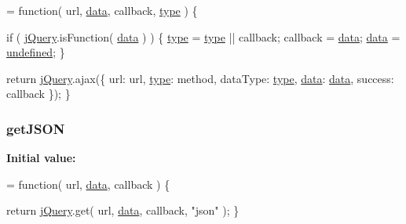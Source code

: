 \begin{DoxyCode}
= \textcolor{keyword}{function}( url, \hyperlink{jquery-1_810_82-vsdoc_8js_a609407b3456fdc3c5671a9fc4a226ff7}{data}, callback, \hyperlink{jquery-1_810_82-vsdoc_8js_a3940565e83a9bfd10d95ffd27536da91}{type} ) \{


        
        \textcolor{keywordflow}{if} ( \hyperlink{jquery-1_810_82-vsdoc_8js_add5237586d970a38a81f990e8eb28c6c}{jQuery}.isFunction( \hyperlink{jquery-1_810_82-vsdoc_8js_a609407b3456fdc3c5671a9fc4a226ff7}{data} ) ) \{
            \hyperlink{jquery-1_810_82-vsdoc_8js_a3940565e83a9bfd10d95ffd27536da91}{type} = \hyperlink{jquery-1_810_82-vsdoc_8js_a3940565e83a9bfd10d95ffd27536da91}{type} || callback;
            callback = \hyperlink{jquery-1_810_82-vsdoc_8js_a609407b3456fdc3c5671a9fc4a226ff7}{data};
            \hyperlink{jquery-1_810_82-vsdoc_8js_a609407b3456fdc3c5671a9fc4a226ff7}{data} = \hyperlink{jquery-1_810_82-vsdoc_8js_a08113a236cc18d2a9d5ce27e638012be}{undefined};
        \}

        \textcolor{keywordflow}{return} \hyperlink{jquery-1_810_82-vsdoc_8js_add5237586d970a38a81f990e8eb28c6c}{jQuery}.ajax(\{
            url: url,
            \hyperlink{jquery-1_810_82-vsdoc_8js_a3940565e83a9bfd10d95ffd27536da91}{type}: method,
            dataType: \hyperlink{jquery-1_810_82-vsdoc_8js_a3940565e83a9bfd10d95ffd27536da91}{type},
            \hyperlink{jquery-1_810_82-vsdoc_8js_a609407b3456fdc3c5671a9fc4a226ff7}{data}: \hyperlink{jquery-1_810_82-vsdoc_8js_a609407b3456fdc3c5671a9fc4a226ff7}{data},
            success: callback
        \});
    \}
\end{DoxyCode}
\hypertarget{jquery-1_810_82-vsdoc_8js_a27b6f13a844bac0871a73628443197b5}{
\subsubsection[{get\-J\-S\-O\-N}]{ get\-J\-S\-O\-N}}\label{jquery-1_810_82-vsdoc_8js_a27b6f13a844bac0871a73628443197b5}
{\bfseries Initial value\-:}
\begin{DoxyCode}
= \textcolor{keyword}{function}( url, \hyperlink{jquery-1_810_82-vsdoc_8js_a609407b3456fdc3c5671a9fc4a226ff7}{data}, callback ) \{


        \textcolor{keywordflow}{return} \hyperlink{jquery-1_810_82-vsdoc_8js_add5237586d970a38a81f990e8eb28c6c}{jQuery}.get( url, \hyperlink{jquery-1_810_82-vsdoc_8js_a609407b3456fdc3c5671a9fc4a226ff7}{data}, callback, \textcolor{stringliteral}{"json"} );
    \}
\end{DoxyCode}
